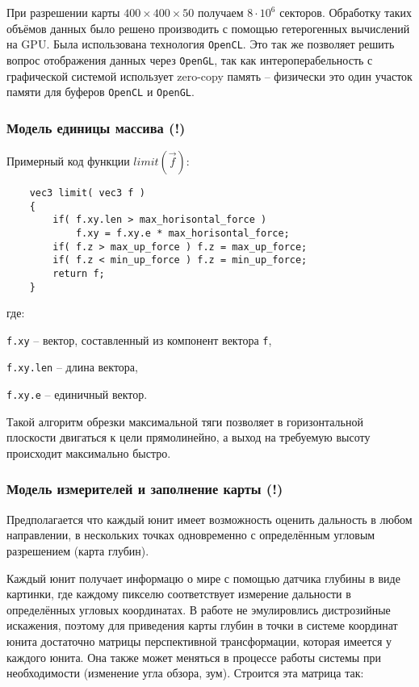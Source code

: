 При разрешении карты $400 \times 400 \times 50$ получаем $8 \cdot 10^6$ секторов.
Обработку таких объёмов данных было решено производить с помощью гетерогенных 
вычислений на GPU. Была использована технология \verb|OpenCL|. Это так же 
позволяет решить вопрос отображения данных через \verb|OpenGL|, так как
интероперабельность с графической системой использует zero-copy память -- 
физически это один участок памяти для буферов \verb|OpenCL| и \verb|OpenGL|.

\newpage
\subsubsection{Модель единицы массива (!)}

Примерный код функции $limit \left( \vec f \right)$:

\begin{verbatim}
    vec3 limit( vec3 f )
    {
        if( f.xy.len > max_horisontal_force )
            f.xy = f.xy.e * max_horisontal_force;
        if( f.z > max_up_force ) f.z = max_up_force;
        if( f.z < min_up_force ) f.z = min_up_force;
        return f;
    }
\end{verbatim}

где:

\verb|f.xy| -- вектор, составленный из компонент вектора \verb|f|,

\verb|f.xy.len| -- длина вектора,

\verb|f.xy.e| -- единичный вектор.

Такой алгоритм обрезки максимальной тяги позволяет в горизонтальной плоскости двигаться к цели прямолинейно,
а выход на требуемую высоту происходит максимально быстро.

\newpage
\subsubsection{Модель измерителей и заполнение карты (!)}

Предполагается что каждый юнит имеет возможность
оценить дальность в любом направлении, в нескольких точках одновременно с определённым 
угловым разрешением (карта глубин).

Каждый юнит получает информацю о мире с помощью датчика глубины в виде картинки,
где каждому пикселю соответствует измерение дальности в определённых угловых координатах. В работе не эмулировлись
дистрозийные искажения, поэтому для приведения карты глубин в точки в системе координат юнита достаточно 
матрицы перспективной трансформации, которая имеется у каждого юнита. Она также может меняться в процессе работы
системы при необходимости (изменение угла обзора, зум). Строится эта матрица так:

